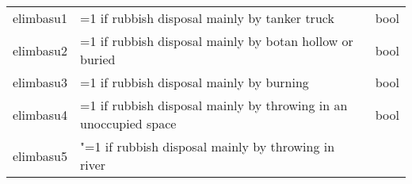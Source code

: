\documentclass[11pt]{article}
\begin{document}
\begin{longtable}[]{@{}lll@{}}
\begin{minipage}[t]{0.19\columnwidth}
elimbasu1\strut
\end{minipage} & \begin{minipage}[t]{0.16\columnwidth}\raggedright\strut
=1 if rubbish disposal mainly by tanker truck\strut
\end{minipage} & \begin{minipage}[t]{0.24\columnwidth}\raggedright\strut
bool\strut
\end{minipage}\tabularnewline
\begin{minipage}[t]{0.19\columnwidth}\raggedright\strut
elimbasu2\strut
\end{minipage} & \begin{minipage}[t]{0.16\columnwidth}\raggedright\strut
=1 if rubbish disposal mainly by botan hollow or buried\strut
\end{minipage} & \begin{minipage}[t]{0.24\columnwidth}\raggedright\strut
bool\strut
\end{minipage}\tabularnewline
\begin{minipage}[t]{0.19\columnwidth}\raggedright\strut
elimbasu3\strut
\end{minipage} & \begin{minipage}[t]{0.16\columnwidth}\raggedright\strut
=1 if rubbish disposal mainly by burning\strut
\end{minipage} & \begin{minipage}[t]{0.24\columnwidth}\raggedright\strut
bool\strut
\end{minipage}\tabularnewline
\begin{minipage}[t]{0.19\columnwidth}\raggedright\strut
elimbasu4\strut
\end{minipage} & \begin{minipage}[t]{0.16\columnwidth}\raggedright\strut
=1 if rubbish disposal mainly by throwing in an unoccupied space\strut
\end{minipage} & \begin{minipage}[t]{0.24\columnwidth}\raggedright\strut
bool\strut
\end{minipage}\tabularnewline
\begin{minipage}[t]{0.19\columnwidth}\raggedright\strut
elimbasu5\strut
\end{minipage} & \begin{minipage}[t]{0.16\columnwidth}\raggedright\strut
"=1 if rubbish disposal mainly by throwing in river\strut
\end{minipage} & \begin{minipage}[t]{0.24\columnwidth}\raggedright\strut

\end{minipage}
\end{longtable}
\end{document}
